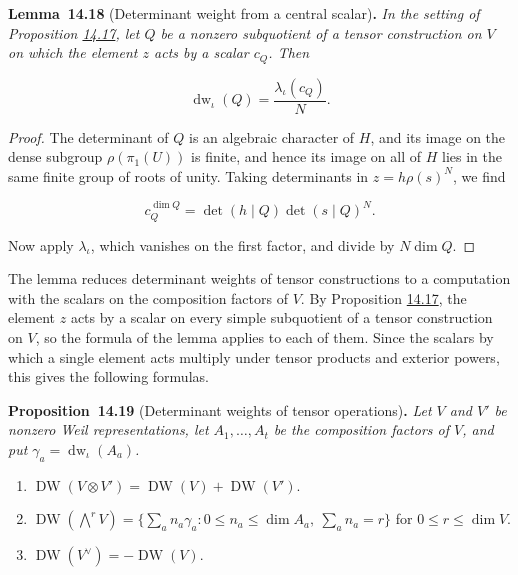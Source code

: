 \documentclass[11pt]{article}
\newenvironment{bpstatement}[2]{\par\addvspace{0.6\baselineskip}\noindent\textbf{#1}#2\textbf{.}\enspace\ignorespaces}
  {\par\addvspace{0.4\baselineskip}}
\newenvironment{bpstatementit}[2]{\begin{bpstatement}{#1}{#2}\itshape\ignorespaces}{\end{bpstatement}}
\begin{document}
\label{bp96}%
\begin{bpstatementit}{Lemma~14.18}{ (Determinant weight from a central scalar)}
In the setting of Proposition \hyperref[bp92]{14.17}, let \(Q\) be a nonzero subquotient of a tensor construction on \(V\) on which the element \(z\) acts by a scalar \(c_Q\). Then

\[
\operatorname{dw}_\iota(Q)=\frac{\lambda_\iota(c_Q)}{N}.
\]
\end{bpstatementit}

\begin{proof}[{Proof}]\label{bp97}%
The determinant of \(Q\) is an algebraic character of \(H\), and its image on the dense subgroup \(\rho(\pi_1(U))\) is finite, and hence its image on all of \(H\) lies in the same finite group of roots of unity. Taking determinants in \(z=h\rho(s)^N\), we find

\[
c_Q^{\dim Q}=\det(h\mid Q)\det(s\mid Q)^N.
\]

Now apply \(\lambda_\iota\), which vanishes on the first factor, and divide by \(N\dim Q\).
\end{proof}

\label{bp98}%
The lemma reduces determinant weights of tensor constructions to a computation with the scalars on the composition factors of \(V\). By Proposition \hyperref[bp92]{14.17}, the element \(z\) acts by a scalar on every simple subquotient of a tensor construction on \(V\), so the formula of the lemma applies to each of them. Since the scalars by which a single element acts multiply under tensor products and exterior powers, this gives the following formulas.

\label{bp99}%
\begin{bpstatementit}{Proposition~14.19}{ (Determinant weights of tensor operations)}
Let \(V\) and \(V'\) be nonzero Weil representations, let \(A_1,\ldots,A_t\) be the composition factors of \(V\), and put \(\gamma_a=\operatorname{dw}_\iota(A_a)\).

\begin{enumerate}
\item \(\operatorname{DW}(V\otimes V')=\operatorname{DW}(V)+\operatorname{DW}(V')\).
\item \(\operatorname{DW}(\bigwedge^rV)=\bigl\{\sum_an_a\gamma_a :
      0\le n_a\le\dim A_a,\ \sum_an_a=r\bigr\}\) for \(0\le r\le\dim V\).
\item \(\operatorname{DW}(V^\vee)=-\operatorname{DW}(V)\).
\end{enumerate}
\end{bpstatementit}
\end{document}
